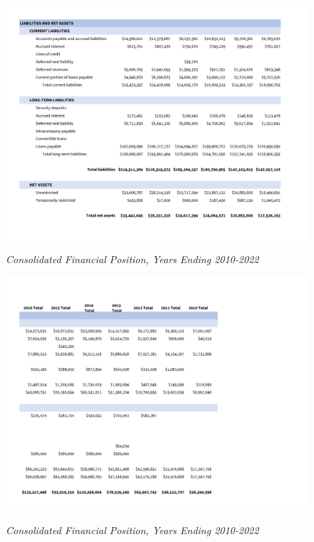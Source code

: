 \begin{figure}[hbt]
    \caption[Consolidated Financial Position, Years Ending 2010–2022]{\textit{Consolidated Financial Position, Years Ending 2010-2022}}\label{fig:consolidated_financial_position_2010-2022} %
    \includegraphics[width=\textwidth]{Consolidated Financial Statements/v5 Spreadsheets/Consolidated_Financial_Position_Years_2010-2022 PDF pages/.pg_0002}\\ %
\end{figure}
\begin{figure}[hbt]
    \caption[Consolidated Financial Position, Years Ending 2010–2022]{\textit{Consolidated Financial Position, Years Ending 2010-2022}}\label{fig:consolidated_financial_position_2010-2022} %
    \includegraphics[width=\textwidth]{Consolidated Financial Statements/v5 Spreadsheets/Consolidated_Financial_Position_Years_2010-2022 PDF pages/.pg_0003}\\ %
\end{figure}
